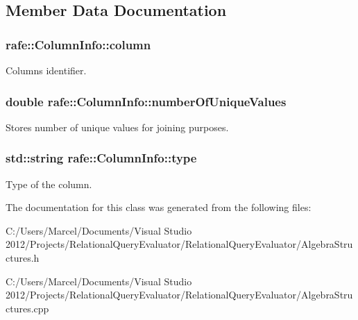 \subsection{Member Data Documentation}
\hypertarget{classrafe_1_1_column_info_a446710a3a03b249da265a785aff1ee18}{
\subsubsection[{column}]{ rafe\+::\+Column\+Info\+::column}}\label{classrafe_1_1_column_info_a446710a3a03b249da265a785aff1ee18}
Columns identifier. \hypertarget{classrafe_1_1_column_info_a3925986dda2c3385a512d6491e282aae}{
\subsubsection[{number\+Of\+Unique\+Values}]{\setlength{\rightskip}{0pt plus 5cm}double rafe\+::\+Column\+Info\+::number\+Of\+Unique\+Values}}\label{classrafe_1_1_column_info_a3925986dda2c3385a512d6491e282aae}
Stores number of unique values for joining purposes. \hypertarget{classrafe_1_1_column_info_a22fd355567e1d07f30fd1deae721577f}{
\subsubsection[{type}]{\setlength{\rightskip}{0pt plus 5cm}std\+::string rafe\+::\+Column\+Info\+::type}}\label{classrafe_1_1_column_info_a22fd355567e1d07f30fd1deae721577f}
Type of the column. 

The documentation for this class was generated from the following files\+:\begin{DoxyCompactItemize}
\item 
C\+:/\+Users/\+Marcel/\+Documents/\+Visual Studio 2012/\+Projects/\+Relational\+Query\+Evaluator/\+Relational\+Query\+Evaluator/Algebra\+Structures.\+h\item 
C\+:/\+Users/\+Marcel/\+Documents/\+Visual Studio 2012/\+Projects/\+Relational\+Query\+Evaluator/\+Relational\+Query\+Evaluator/Algebra\+Structures.\+cpp\end{DoxyCompactItemize}
